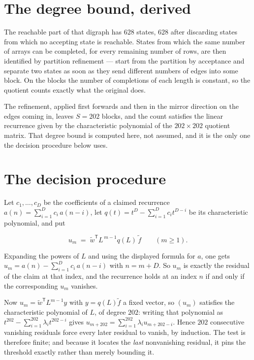 \documentclass[11pt]{article}
\theoremstyle{definition}
\begin{document}
\section{The degree bound, derived}

The reachable part of that digraph has $628$ states, $628$ after discarding states from which no accepting state is reachable. States from which the same number of arrays can be completed, for every remaining number of rows, are then identified by partition refinement --- start from the partition by acceptance and separate two states as soon as they send different numbers of edges into some block. On the blocks the number of completions of each length is constant, so the quotient counts exactly what the original does.

The refinement, applied first forwards and then in the mirror direction on the edges coming in, leaves $S = 202$ blocks, and the count satisfies the linear recurrence given by the characteristic polynomial of the $202 \times 202$ quotient matrix. That degree bound is computed here, not assumed, and it is the only one the decision procedure below uses.

\section{The decision procedure}

Let $c_1,\dots,c_D$ be the coefficients of a claimed recurrence $a(n) = \sum_{i=1}^{D} c_i\,a(n-i)$, let $q(t) = t^{D} - \sum_{i=1}^{D} c_i t^{D-i}$ be its characteristic polynomial, and put

\[u_m \;=\; \tilde w^{\mathsf T} L^{\,m-1} q(L)\,\tilde f \qquad (m \ge 1).\]

Expanding the powers of $L$ and using the displayed formula for $a$, one gets $u_m = a(n) - \sum_{i=1}^{D} c_i\,a(n-i)$ with $n = m + D$. So $u_m$ is exactly the residual of the claim at that index, and the recurrence holds at an index $n$ if and only if the corresponding $u_m$ vanishes.

Now $u_m = \tilde w^{\mathsf T} L^{m-1} y$ with $y = q(L)\tilde f$ a fixed vector, so $(u_m)$ satisfies the characteristic polynomial of $L$, of degree $202$: writing that polynomial as $t^{202} - \sum_{i=1}^{202} \lambda_i t^{202-i}$ gives $u_{m+202} = \sum_{i=1}^{202} \lambda_i u_{m+202-i}$. Hence $202$ consecutive vanishing residuals force every later residual to vanish, by induction. The test is therefore finite; and because it locates the {\itshape last} nonvanishing residual, it pins the threshold exactly rather than merely bounding it.
\end{document}
